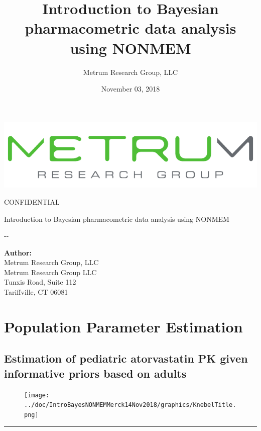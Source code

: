 \documentclass[]{article}
\title{Introduction to Bayesian pharmacometric data analysis using NONMEM}
\author{Metrum Research Group, LLC}
\date{November 03, 2018}
\newcommand{\todaymetrum}{\the\year-\twodigit{\month}-\twodigit{\day}}
\newcommand{\doctitle}{Introduction to Bayesian pharmacometric data analysis using NONMEM}
\newcommand{\scientist}{Metrum Research Group, LLC}
\begin{document}
\begin{center}
\includegraphics[scale=.7]{mrglogo.pdf}
\vspace{1cm}

{\Large CONFIDENTIAL}
\vspace{3.0cm}

{\huge \doctitle}
\vspace{1cm}

\todaymetrum
\vspace{6cm}

{\large\bfseries Author:}\\
\scientist \\
 Metrum Research Group LLC\\
Tunxis Road, Suite 112\\
Tariffville, CT 06081\\
\end{center}


\newpage



{
\hypersetup{linkcolor=black}
\setcounter{tocdepth}{2}
\tableofcontents
}
\section{Population Parameter
Estimation}\label{population-parameter-estimation}

\subsection{Estimation of pediatric atorvastatin PK given informative
priors based on
adults}\label{estimation-of-pediatric-atorvastatin-pk-given-informative-priors-based-on-adults}

\begin{figure}[htbp]
\centering
\texttt{[image: ../doc/IntroBayesNONMEMMerck14Nov2018/graphics/KnebelTitle.png]}
\caption{}
\end{figure}

\begin{center}\rule{0.5\linewidth}{\linethickness}\end{center}
\end{document}
